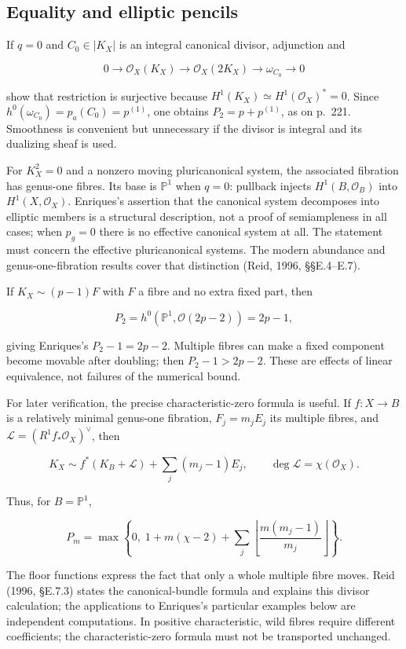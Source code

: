 \subsection{Equality and elliptic pencils}

If \(q=0\) and \(C_0\in|K_X|\) is an integral canonical divisor, adjunction and

\[
0\to\mathcal O_X(K_X)\to\mathcal O_X(2K_X)
\to\omega_{C_0}\to0
\]

show that restriction is surjective because \(H^1(K_X)\simeq H^1(\mathcal O_X)^*=0\). Since \(h^0(\omega_{C_0})=p_a(C_0)=p^{(1)}\), one obtains \(P_2=p+p^{(1)}\), as on p.~221. Smoothness is convenient but unnecessary if the divisor is integral and its dualizing sheaf is used.

For \(K_X^2=0\) and a nonzero moving pluricanonical system, the associated fibration has genus-one fibres. Its base is \(\mathbb P^1\) when \(q=0\): pullback injects \(H^1(B,\mathcal O_B)\) into \(H^1(X,\mathcal O_X)\). Enriques's assertion that the canonical system decomposes into elliptic members is a structural description, not a proof of semiampleness in all cases; when \(p_g=0\) there is no effective canonical system at all. The statement must concern the effective pluricanonical systems. The modern abundance and genus-one-fibration results cover that distinction (Reid, 1996, §§E.4--E.7).

If \(K_X\sim(p-1)F\) with \(F\) a fibre and no extra fixed part, then

\[
P_2=h^0(\mathbb P^1,\mathcal O(2p-2))=2p-1,
\]

giving Enriques's \(P_2-1=2p-2\). Multiple fibres can make a fixed component become movable after doubling; then \(P_2-1>2p-2\). These are effects of linear equivalence, not failures of the numerical bound.

For later verification, the precise characteristic-zero formula is useful. If \(f:X\to B\) is a relatively minimal genus-one fibration, \(F_j=m_jE_j\) its multiple fibres, and \(\mathcal L=(R^1f_*\mathcal O_X)^\vee\), then

\[
K_X\sim f^*(K_B+\mathcal L)+\sum_j(m_j-1)E_j,
\qquad \deg\mathcal L=\chi(\mathcal O_X).
\tag{VI-CBF}
\]

Thus, for \(B=\mathbb P^1\),

\[
P_m=\max\left\{0,\;1+m(\chi-2)+
\sum_j\left\lfloor\frac{m(m_j-1)}{m_j}\right\rfloor\right\}.
\tag{VI-F}
\]

The floor functions express the fact that only a whole multiple fibre moves. Reid (1996, §E.7.3) states the canonical-bundle formula and explains this divisor calculation; the applications to Enriques's particular examples below are independent computations. In positive characteristic, wild fibres require different coefficients; the characteristic-zero formula must not be transported unchanged.

